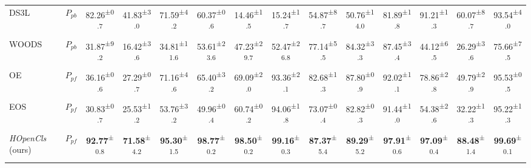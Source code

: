 \begin{table*}[!t]
{\begin{tabular}{lccccccccccccc}
    DS3L~\cite{DS3L}                                          & $P_{pb}$                     & 82.26\textsuperscript{±0.7}          & 41.83\textsuperscript{±3.0}          & 71.59\textsuperscript{±4.2}           & 60.37\textsuperscript{±0.6}          & 14.46\textsuperscript{±1.5}          & 15.24\textsuperscript{±1.7}           & 54.87\textsuperscript{±8.7}          & 50.76\textsuperscript{±14.0}         & 81.89\textsuperscript{±1.8}          & 91.21\textsuperscript{±1.3}          & 60.07\textsuperscript{±8.7}          & 93.54\textsuperscript{±4.0}            \\
    WOODS~\cite{WOODS}                                        & $P_{pb}$                     & 31.87\textsuperscript{±9.2}          & 16.42\textsuperscript{±3.6}          & 34.81\textsuperscript{±11.6}          & 53.61\textsuperscript{±23.6}         & 47.23\textsuperscript{±29.7}         & 52.47\textsuperscript{±26.8}          & 77.14\textsuperscript{±5.5}          & 84.32\textsuperscript{±3.3}          & 87.45\textsuperscript{±3.4}          & 44.12\textsuperscript{±6.5}          & 26.29\textsuperscript{±3.6}          & 75.66\textsuperscript{±7.5}            \\
    OE~\cite{OE}                                           & $P_{pf}$                     & 36.16\textsuperscript{±0.6}          & 27.29\textsuperscript{±0.7}          & 71.16\textsuperscript{±4.6}           & 65.40\textsuperscript{±3.2}          & 69.09\textsuperscript{±2.0}          & 93.36\textsuperscript{±2.1}           & 82.68\textsuperscript{±1.3}          & 87.80\textsuperscript{±0.9}          & 92.02\textsuperscript{±1.1}          & 78.86\textsuperscript{±2.8}          & 49.79\textsuperscript{±2.9}          & 95.53\textsuperscript{±0.5}            \\
    EOS~\cite{EOS}                                          & $P_{pf}$                     & 30.83\textsuperscript{±0.7}          & 25.53\textsuperscript{±1.2}          & 53.76\textsuperscript{±3.2}           & 49.96\textsuperscript{±0.4}          & 60.74\textsuperscript{±0.2}          & 94.06\textsuperscript{±1.8}           & 73.07\textsuperscript{±0.4}          & 82.82\textsuperscript{±0.3}          & 91.44\textsuperscript{±1.0}          & 54.38\textsuperscript{±2.6}          & 32.22\textsuperscript{±1.3}          & 95.22\textsuperscript{±1.3}            \\
    \textit{HOpenCls} (ours)                                     & $P_{pf}$                     & \textbf{92.77}\textsuperscript{±0.8} & \textbf{71.58}\textsuperscript{±4.2} & \textbf{95.30}\textsuperscript{±1.5}  & \textbf{98.77}\textsuperscript{±0.2} & \textbf{98.50}\textsuperscript{±0.2} & \textbf{99.16}\textsuperscript{±0.3}  & \textbf{87.37}\textsuperscript{±5.4} & \textbf{89.29}\textsuperscript{±5.2} & \textbf{97.91}\textsuperscript{±0.6} & \textbf{97.09}\textsuperscript{±0.4} & \textbf{88.48}\textsuperscript{±1.4} & \textbf{99.69}\textsuperscript{±0.1}   \\
    \hline
    \end{tabular}
    }
\end{table*}